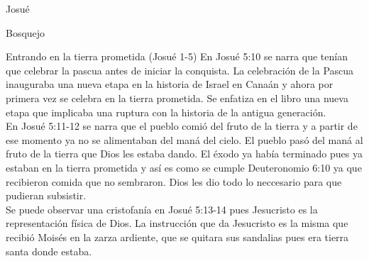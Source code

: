\begin{section}{Josué}
\begin{subsection}{Bosquejo}
\begin{subsubsection}{Entrando en la tierra prometida (Josué 1-5)}
En Josué 5:10 se narra que tenían que celebrar la pascua antes de iniciar la conquista. La celebración de la Pascua inauguraba una nueva etapa en la historia de Israel en Canaán y ahora por primera vez se celebra en la tierra prometida. Se enfatiza en el libro una nueva etapa que implicaba una ruptura con la historia de la antigua generación.\\
En Josué 5:11-12 se narra que el pueblo comió del fruto de la tierra y a partir de ese momento ya no se alimentaban del maná del cielo. El pueblo pasó del maná al fruto de la tierra que Dios les estaba dando. El éxodo ya había terminado pues ya estaban en la tierra prometida y así es como se cumple Deuteronomio 6:10 ya que recibieron comida que no sembraron. Dios les dio todo lo neccesario para que pudieran subsistir.\\
Se puede observar una cristofanía en Josué 5:13-14 pues Jesucristo es la representación física de Dios. La instrucción que da Jesucristo es la misma que recibió Moisés en la zarza ardiente, que se quitara sus sandalias pues era tierra santa donde estaba.\\

		\end{subsubsection}
	

\end{subsection}
\end{section}
